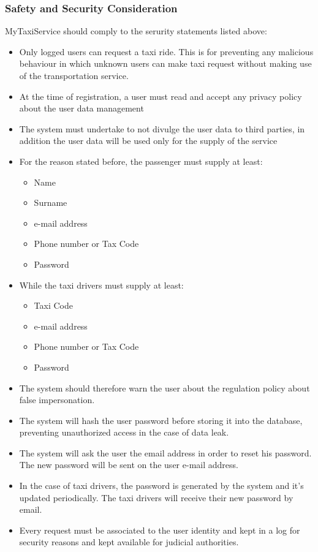 \documentclass[11pt, a4paper,titlepage]{article}
\newcommand{\productname}{MyTaxiService }
\begin{document}
\subsubsection{Safety and Security Consideration}
\productname should comply to the serurity statements listed above: \newline
\begin{itemize}
	\item Only logged users can request a taxi ride. This is for preventing any malicious behaviour in which unknown users can make taxi request without making use of the transportation service.
	\item At the time of registration, a user must read and accept any privacy policy about the user data management
	\item The system must undertake to not divulge the user data to third parties, in addition the user data will be used only for the supply of the service
	\item For the reason stated before, the passenger must supply at least:
		\begin{itemize}
			\item Name
			\item Surname
			\item e-mail address
			\item Phone number or Tax Code
			\item Password
		\end{itemize}
		\item While the taxi drivers must supply at least:
		\begin{itemize}
			\item Taxi Code
			\item e-mail address
			\item Phone number or Tax Code
			\item Password
		\end{itemize}
	\item The system should therefore warn the user about the regulation policy about false impersonation.
	\item The system will hash the user password before storing it into the database, preventing unauthorized access in the case of data leak.
	\item The system will ask the user the email address in order to reset his password. The new password will be sent on the user e-mail address.
	\item In the case of taxi drivers, the password is generated by the system and it's updated periodically. The taxi drivers will receive their new password by email.
	\item Every request must be associated to the user identity and kept in a log for security reasons and kept available for  judicial authorities.
\end{itemize}
\end{document}
